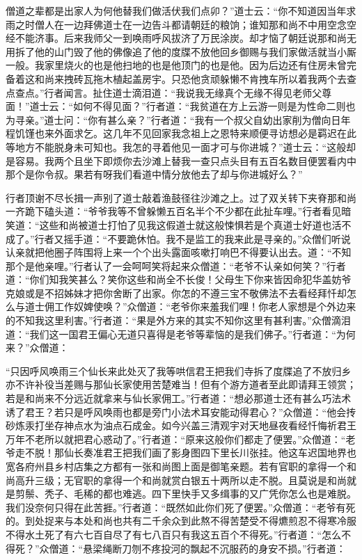 \documentclass[12pt,UTF8]{ctexbook}
\begin{document}
僧道之辈都是出家人为何他替我们做活伏我们点卯？”道士云：“你不知道因当年求雨之时僧人在一边拜佛道士在一边告斗都请朝廷的粮饷；谁知那和尚不中用空念空经不能济事。后来我师父一到唤雨呼风拔济了万民涂炭。却才恼了朝廷说那和尚无用拆了他的山门毁了他的佛像追了他的度牒不放他回乡御赐与我们家做活就当小厮一般。我家里烧火的也是他扫地的也是他顶门的也是他。因为后边还有住房未曾完备着这和尚来拽砖瓦拖木植起盖房宇。只恐他贪顽躲懒不肯拽车所以着我两个去查点查点。”行者闻言。扯住道士滴泪道：“我说我无缘真个无缘不得见老师父尊面！”道士云：“如何不得见面？”行者道：“我贫道在方上云游一则是为性命二则也为寻亲。”道士问：“你有甚么亲？”行者道：“我有一个叔父自幼出家削为僧向日年程饥馑也来外面求乞。这几年不见回家我念祖上之恩特来顺便寻访想必是羁迟在此等地方不能脱身未可知也。我怎的寻着他见一面才可与你进城？”道士云：“这般却是容易。我两个且坐下即烦你去沙滩上替我一查只点头目有五百名数目便罢看内中那个是你令叔。果若有呀我们看道中情分放他去了却与你进城好么？”

行者顶谢不尽长揖一声别了道士敲着渔鼓径往沙滩之上。过了双关转下夹脊那和尚一齐跪下磕头道：“爷爷我等不曾躲懒五百名半个不少都在此扯车哩。”行者看见暗笑道：“这些和尚被道士打怕了见我这假道士就这般悚惧若是个真道士好道也活不成了。”行者又摇手道：“不要跪休怕。我不是监工的我来此是寻亲的。”众僧们听说认亲就把他圈子阵围将上来一个个出头露面咳嗽打响巴不得要认出去。道：“不知那个是他亲哩。”行者认了一会呵呵笑将起来众僧道：“老爷不认亲如何笑？”行者道：“你们知我笑甚么？笑你这些和尚全不长俊！父母生下你来皆因命犯华盖妨爷克娘或是不招姊妹才把你舍断了出家。你怎的不遵三宝不敬佛法不去看经拜忏却怎么与道士佣工作奴婢使唤？”众僧道：“老爷你来羞我们哩！你老人家想是个外边来的不知我这里利害。”行者道：“果是外方来的其实不知你这里有甚利害。”众僧滴泪道：“我们这一国君王偏心无道只喜得是老爷等辈恼的是我们佛子。”行者道：“为何来？”众僧道：

“只因呼风唤雨三个仙长来此处灭了我等哄信君王把我们寺拆了度牒追了不放归乡亦不许补役当差赐与那仙长家使用苦楚难当！但有个游方道者至此即请拜王领赏；若是和尚来不分远近就拿来与仙长家佣工。”行者道：“想必那道士还有甚么巧法术诱了君王？若只是呼风唤雨也都是旁门小法术耳安能动得君心？”众僧道：“他会抟砂炼汞打坐存神点水为油点石成金。如今兴盖三清观宇对天地昼夜看经忏悔祈君王万年不老所以就把君心惑动了。”行者道：“原来这般你们都走了便罢。”众僧道：“老爷走不脱！那仙长奏准君王把我们画了影身图四下里长川张挂。他这车迟国地界也宽各府州县乡村店集之方都有一张和尚图上面是御笔亲题。若有官职的拿得一个和尚高升三级；无官职的拿得一个和尚就赏白银五十两所以走不脱。且莫说是和尚就是剪鬃、秃子、毛稀的都也难逃。四下里快手又多缉事的又广凭你怎么也是难脱。我们没奈何只得在此苦捱。”行者道：“既然如此你们死了便罢。”众僧道：“老爷有死的。到处捉来与本处和尚也共有二千余众到此熬不得苦楚受不得爊煎忍不得寒冷服不得水土死了有六七百自尽了有七八百只有我这五百个不得死。”行者道：“怎么不得死？”众僧道：“悬梁绳断刀刎不疼投河的飘起不沉服药的身安不损。”行者道：
\end{document}
